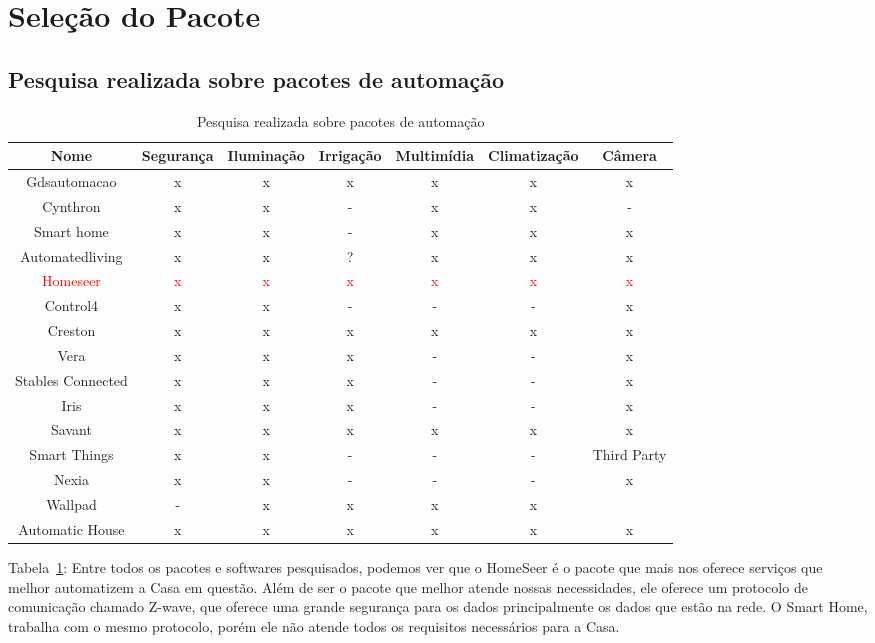 \section{Seleção do Pacote}

\subsection{Pesquisa realizada sobre pacotes de automação}

\begin{table}[H]

\begin{sideways}
\begin{tabular}{|c|c|c|c|c|c|c|}
\hline 
\textbf{Nome} & \textbf{Segurança} & \textbf{Iluminação} & \textbf{Irrigação} & \textbf{Multimídia} & \textbf{Climatização} & \textbf{Câmera}\tabularnewline
\hline 
\hline 
Gdsautomacao & x & x & x & x & x & x\tabularnewline
\hline 
Cynthron & x & x & - & x & x & -\tabularnewline
\hline 
Smart home & x & x & - & x & x & x\tabularnewline
\hline 
Automatedliving & x & x & ? & x & x & x\tabularnewline
\hline 
\textcolor{red}{Homeseer} & \textcolor{red}{x} & \textcolor{red}{x} & \textcolor{red}{x} & \textcolor{red}{x} & \textcolor{red}{x} & \textcolor{red}{x}\tabularnewline
\hline 
Control4 & x & x & - & - & - & x\tabularnewline
\hline 
Creston & x & x & x & x & x & x\tabularnewline
\hline 
Vera & x & x & x & - & - & x\tabularnewline
\hline 
Stables Connected & x & x & x & - & - & x\tabularnewline
\hline 
Iris & x & x & x & - & - & x\tabularnewline
\hline 
Savant & x & x & x & x & x & x\tabularnewline
\hline 
Smart Things & x & x & - & - & - & Third Party\tabularnewline
\hline 
Nexia & x & x & - & - & - & x\tabularnewline
\hline 
Wallpad & - & x & x & x & x & \tabularnewline
\hline 
Automatic House & x & x & x & x & x & x\tabularnewline
\hline 
\end{tabular}
\end{sideways}
\caption{Pesquisa realizada sobre pacotes de automação}
\label{Pesquisa_realizada_sobre_pacotes}
\end{table}

Tabela~\ref{Pesquisa_realizada_sobre_pacotes}: Entre todos os pacotes e softwares pesquisados, podemos ver que o HomeSeer é o pacote que mais nos oferece serviços que melhor automatizem a Casa em questão. Além de ser o pacote que melhor atende nossas necessidades, ele oferece um protocolo de comunicação chamado Z-wave, que oferece uma grande segurança para os dados principalmente os dados que estão na rede. O Smart Home, trabalha com o mesmo protocolo, porém ele não atende todos os requisitos necessários para a Casa.

